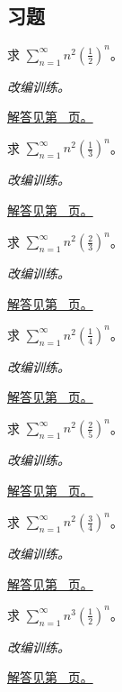 \documentclass[12pt,fontset=fandol]{ctexart}
\begin{document}
\subsection{习题}
\begin{example}[平方系数的几何和]\label{ex:c27q1}
求 $\displaystyle\sum_{n=1}^\infty n^2(\frac{1}{2})^n$。
\par\textit{改编训练。}\par\hyperref[ans:c27q1]{解答见第~\pageref{ans:c27q1} 页。}
\end{example}
\begin{example}[平方系数的几何和]\label{ex:c27q2}
求 $\displaystyle\sum_{n=1}^\infty n^2(\frac{1}{3})^n$。
\par\textit{改编训练。}\par\hyperref[ans:c27q2]{解答见第~\pageref{ans:c27q2} 页。}
\end{example}
\begin{example}[平方系数的几何和]\label{ex:c27q3}
求 $\displaystyle\sum_{n=1}^\infty n^2(\frac{2}{3})^n$。
\par\textit{改编训练。}\par\hyperref[ans:c27q3]{解答见第~\pageref{ans:c27q3} 页。}
\end{example}
\begin{example}[平方系数的几何和]\label{ex:c27q4}
求 $\displaystyle\sum_{n=1}^\infty n^2(\frac{1}{4})^n$。
\par\textit{改编训练。}\par\hyperref[ans:c27q4]{解答见第~\pageref{ans:c27q4} 页。}
\end{example}
\begin{example}[平方系数的几何和]\label{ex:c27q5}
求 $\displaystyle\sum_{n=1}^\infty n^2(\frac{2}{5})^n$。
\par\textit{改编训练。}\par\hyperref[ans:c27q5]{解答见第~\pageref{ans:c27q5} 页。}
\end{example}
\begin{example}[平方系数的几何和]\label{ex:c27q6}
求 $\displaystyle\sum_{n=1}^\infty n^2(\frac{3}{4})^n$。
\par\textit{改编训练。}\par\hyperref[ans:c27q6]{解答见第~\pageref{ans:c27q6} 页。}
\end{example}
\begin{example}[立方系数的几何和]\label{ex:c27q7}
求 $\displaystyle\sum_{n=1}^\infty n^3(\frac{1}{2})^n$。
\par\textit{改编训练。}\par\hyperref[ans:c27q7]{解答见第~\pageref{ans:c27q7} 页。}
\end{example}
\end{document}
